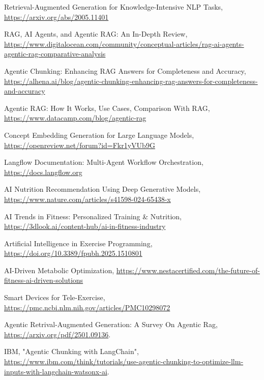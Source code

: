 \documentclass[conference]{IEEEtran}
\begin{document}
\begin{thebibliography}{00}
 Retrieval-Augmented Generation for Knowledge-Intensive NLP Tasks, \url{https://arxiv.org/abs/2005.11401}

 RAG, AI Agents, and Agentic RAG: An In-Depth Review, \url{https://www.digitalocean.com/community/conceptual-articles/rag-ai-agents-agentic-rag-comparative-analysis}

 Agentic Chunking: Enhancing RAG Answers for Completeness and Accuracy, \url{https://alhena.ai/blog/agentic-chunking-enhancing-rag-answers-for-completeness-and-accuracy}

 Agentic RAG: How It Works, Use Cases, Comparison With RAG, \url{https://www.datacamp.com/blog/agentic-rag}

 Concept Embedding Generation for Large Language Models, \url{https://openreview.net/forum?id=Fkr1yVUb9G}

 Langflow Documentation: Multi-Agent Workflow Orchestration, \url{https://docs.langflow.org}

 AI Nutrition Recommendation Using Deep Generative Models, \url{https://www.nature.com/articles/s41598-024-65438-x}

 AI Trends in Fitness: Personalized Training \& Nutrition, \url{https://3dlook.ai/content-hub/ai-in-fitness-industry}

 Artificial Intelligence in Exercise Programming, \url{https://doi.org/10.3389/fpubh.2025.1510801}

 AI-Driven Metabolic Optimization, \url{https://www.nestacertified.com/the-future-of-fitness-ai-driven-solutions}

 Smart Devices for Tele-Exercise, \url{https://pmc.ncbi.nlm.nih.gov/articles/PMC10298072}

 Agentic Retrival-Augmented Generation: A Survey On Agentic Rag, \url{https://arxiv.org/pdf/2501.09136}.

 IBM, "Agentic Chunking with LangChain", \url{https://www.ibm.com/think/tutorials/use-agentic-chunking-to-optimize-llm-inputs-with-langchain-watsonx-ai}.

\end{thebibliography}
\end{document}
